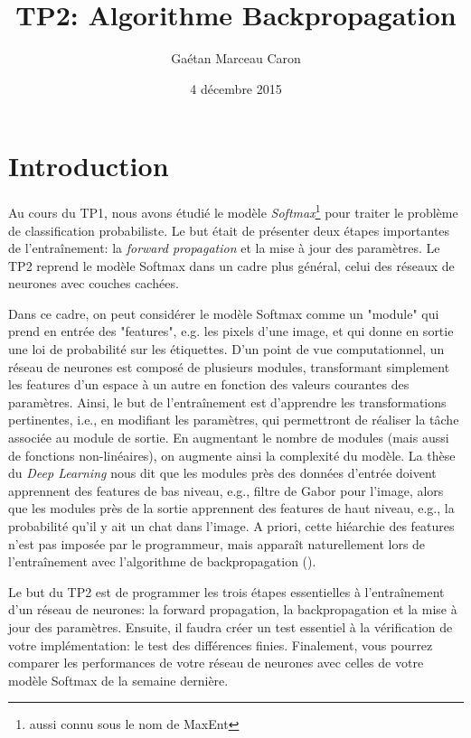 \documentclass{article}
\title{TP2: Algorithme Backpropagation}
\author{Gaétan Marceau Caron}
\date{4 décembre 2015}
\begin{document}
\maketitle

\section{Introduction}
Au cours du TP1, nous avons étudié le modèle {\it Softmax}\footnote{aussi connu sous le nom de MaxEnt} pour traiter le problème de classification probabiliste.
Le but était de présenter deux étapes importantes de l'entraînement: la {\it forward propagation} et la mise à jour des paramètres.
Le TP2 reprend le modèle Softmax dans un cadre plus général, celui des réseaux de neurones avec couches cachées.

Dans ce cadre, on peut considérer le modèle Softmax comme un "module" qui prend en entrée des "features", e.g. les pixels d'une image, et qui donne en sortie une loi de probabilité sur les étiquettes.
D'un point de vue computationnel, un réseau de neurones est composé de plusieurs modules, transformant simplement les features d'un espace à un autre en fonction des valeurs courantes des paramètres.
Ainsi, le but de l'entraînement est d'apprendre les transformations pertinentes, i.e., en modifiant les paramètres, qui permettront de réaliser la tâche associée au module de sortie. 
En augmentant le nombre de modules (mais aussi de fonctions non-linéaires), on augmente ainsi la complexité du modèle.
La thèse du {\it Deep Learning} nous dit que les modules près des données d'entrée doivent apprennent des features de bas niveau, e.g., filtre de Gabor pour l'image, alors que les modules près de la sortie apprennent des features de haut niveau, e.g., la probabilité qu'il y ait un chat dans l'image.
A priori, cette hiéarchie des features n'est pas imposée par le programmeur, mais apparaît naturellement lors de l'entraînement avec l'algorithme de backpropagation (\cite{Rumelhart:1988}).

Le but du TP2 est de programmer les trois étapes essentielles à l'entraînement d'un réseau de neurones: la forward propagation, la backpropagation et la mise à jour des paramètres.
Ensuite, il faudra créer un test essentiel à la vérification de votre implémentation: le test des différences finies.
Finalement, vous pourrez comparer les performances de votre réseau de neurones avec celles de votre modèle Softmax de la semaine dernière.
\newpage 
\end{document}
